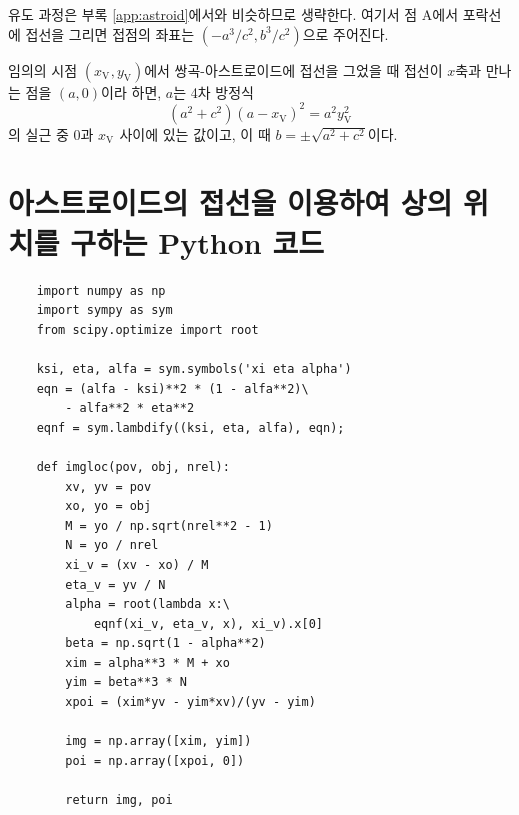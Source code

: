 \documentclass[twocolumn]{article}
\begin{document}
유도 과정은 부록 \ref{app:astroid}에서와 비슷하므로 생략한다.
여기서 점 A에서 포락선에 접선을 그리면 접점의 좌표는 $(-a^3/c^2, b^3/c^2)$으로 주어진다.

임의의 시점 $(x_{\mathrm{V}^{}}, y_{\mathrm{V}}^{})$에서 쌍곡-아스트로이드에 접선을 그었을 때 접선이 $x$축과 만나는 점을 $(a,0)$이라 하면, $a$는 4차 방정식
$$ \left( a^2 + c^2 \right) \left(a - x_{\mathrm{V}}^{} \right)^2 = a^2 y_{\mathrm{V}}^2$$
의 실근 중 $0$과 $x_{\mathrm{V}^{}}$ 사이에 있는 값이고, 이 때 $b = \pm \sqrt{a^2 + c^2}$이다.

\section{아스트로이드의 접선을 이용하여 상의 위치를 구하는 Python 코드} \label{app:python}
\begin{verbatim}
	import numpy as np
	import sympy as sym
	from scipy.optimize import root
	
	ksi, eta, alfa = sym.symbols('xi eta alpha')
	eqn = (alfa - ksi)**2 * (1 - alfa**2)\
	    - alfa**2 * eta**2
	eqnf = sym.lambdify((ksi, eta, alfa), eqn);
	
	def imgloc(pov, obj, nrel):
	    xv, yv = pov
	    xo, yo = obj
	    M = yo / np.sqrt(nrel**2 - 1)
	    N = yo / nrel
	    xi_v = (xv - xo) / M
	    eta_v = yv / N
	    alpha = root(lambda x:\
	        eqnf(xi_v, eta_v, x), xi_v).x[0]
	    beta = np.sqrt(1 - alpha**2)
	    xim = alpha**3 * M + xo
	    yim = beta**3 * N
	    xpoi = (xim*yv - yim*xv)/(yv - yim)
	
	    img = np.array([xim, yim])
	    poi = np.array([xpoi, 0])
	
	    return img, poi
\end{verbatim}

\end{document}
